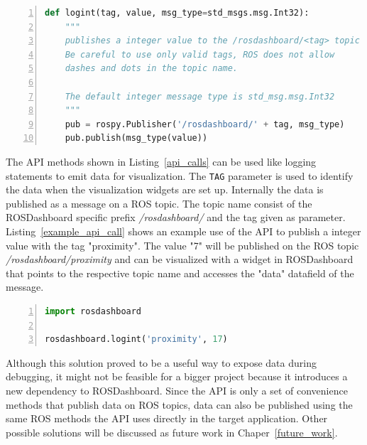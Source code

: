 \begin{lstlisting}[float,frame=single,caption={Implemented logint API method.},label=api_implementation,language=Python,numbers=left,breaklines=true]
def logint(tag, value, msg_type=std_msgs.msg.Int32):
    """
    publishes a integer value to the /rosdashboard/<tag> topic
    Be careful to use only valid tags, ROS does not allow
    dashes and dots in the topic name.
    
    The default integer message type is std_msg.msg.Int32
    """
    pub = rospy.Publisher('/rosdashboard/' + tag, msg_type)
    pub.publish(msg_type(value))
\end{lstlisting}

The API methods shown in Listing~\ref{api_calls} can be used like logging statements to emit data for visualization. The \verb+TAG+ parameter is used to identify the data when the visualization widgets are set up. Internally the data is published as a message on a ROS topic. The topic name consist of the ROSDashboard specific prefix \emph{/rosdashboard/} and the tag given as parameter. Listing~\ref{example_api_call} shows an example use of the API to publish a integer value with the tag "proximity". The value "7" will be published on the ROS topic \emph{/rosdashboard/proximity} and can be visualized with a widget in ROSDashboard that points to the respective topic name and accesses the "data" datafield of the message.

\pagebreak

\begin{lstlisting}[frame=single,caption={Example API usage.},label=example_api_call,language=Python,numbers=left,breaklines=true]
import rosdashboard

rosdashboard.logint('proximity', 17)
\end{lstlisting}

Although this solution proved to be a useful way to expose data during debugging, it might not be feasible for a bigger project because it introduces a new dependency to ROSDashboard. Since the API is only a set of convenience methods that publish data on ROS topics, data can also be published using the same ROS methods the API uses directly in the target application. Other possible solutions will be discussed as future work in Chaper~\ref{future_work}.
